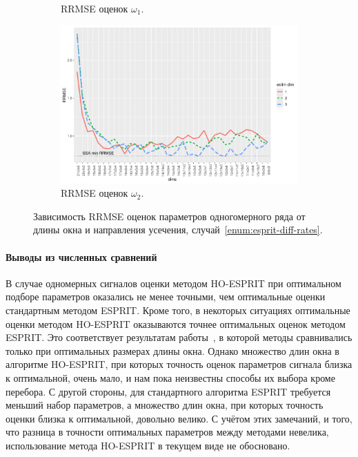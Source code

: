 \documentclass[specialist,
  substylefile=spbu_report.rtx,
subf,href,colorlinks=true, 12pt]{disser}
\theoremstyle{plain}
\theoremstyle{definition}
\theoremstyle{remark}
\begin{document}
\begin{figure}[!ht]
\begin{subfigure}{0.49\linewidth}
    \caption{RRMSE оценок $\omega_1$.}
    \label{fig:freq1_dims}
  \end{subfigure}
  \begin{subfigure}{0.49\linewidth}
    \includegraphics[width=\linewidth, height=0.167\textheight]{freq2_dims.pdf}
    \caption{RRMSE оценок $\omega_2$.}
    \label{fig:freq2_dims}
  \end{subfigure}
  \caption{Зависимость RRMSE оценок параметров одногомерного ряда
    от длины окна и направления усечения,
  случай~\ref{enum:esprit-diff-rates}.}
  \label{fig:dims_diff_rates}
\end{figure}

\paragraph{Выводы из численных сравнений}
В случае одномерных сигналов оценки методом HO-ESPRIT при оптимальном подборе параметров
оказались не менее точными, чем оптимальные оценки стандартным методом ESPRIT.
Кроме того, в некоторых ситуациях оптимальные оценки методом HO-ESPRIT оказываются точнее
оптимальных оценок методом ESPRIT.
Это соответствует результатам работы~\cite{hosvd-hooi-separation}, в которой методы
сравнивались только при оптимальных размерах длины окна.
Однако множество длин окна в алгоритме HO-ESPRIT, при которых точность оценок параметров сигнала
близка к оптимальной, очень мало, и нам пока неизвестны способы их выбора кроме перебора.
С другой стороны, для стандартного алгоритма ESPRIT требуется меньший набор параметров,
а множество длин окна, при которых точность оценки близка к оптимальной, довольно велико.
С учётом этих замечаний, и того, что разница в точности оптимальных
параметров между методами невелика, использование метода HO-ESPRIT в текущем виде
не обосновано.
\end{document}
